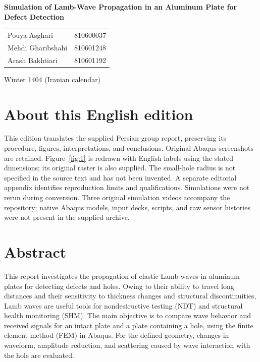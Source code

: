 \documentclass[11pt,a4paper]{article}
\begin{document}
\hypersetup{pageanchor=false}
\begin{titlepage}\centering\vspace*{25mm}
{\LARGE\bfseries Simulation of Lamb-Wave Propagation in an Aluminum Plate for Defect Detection\par}
\vspace{18mm}{\large Instructor: Dr. Ganjiani\par}\vspace{12mm}{\large Group 11\par}\vspace{6mm}
\begin{tabular}{ll}Pouya Asghari&810600037\\Mehdi Gharibshahi&810601248\\Arash Bakhtiari&810601192\end{tabular}
\vfill{\large Winter 1404 (Iranian calendar)\par}
\end{titlepage}\hypersetup{pageanchor=true}
\section*{About this English edition}
This edition translates the supplied Persian group report, preserving its procedure, figures, interpretations, and conclusions. Original Abaqus screenshots are retained. Figure~\ref{fig:1} is redrawn with English labels using the stated dimensions; its original raster is also supplied. The small-hole radius is not specified in the source text and has not been invented. A separate editorial appendix identifies reproduction limits and qualifications. Simulations were not rerun during conversion. Three original simulation videos accompany the repository; native Abaqus models, input decks, scripts, and raw sensor histories were not present in the supplied archive.
\section*{Abstract}
This report investigates the propagation of elastic Lamb waves in aluminum plates for detecting defects and holes. Owing to their ability to travel long distances and their sensitivity to thickness changes and structural discontinuities, Lamb waves are useful tools for nondestructive testing (NDT) and structural health monitoring (SHM). The main objective is to compare wave behavior and received signals for an intact plate and a plate containing a hole, using the finite element method (FEM) in Abaqus. For the defined geometry, changes in waveform, amplitude reduction, and scattering caused by wave interaction with the hole are evaluated.
\clearpage\tableofcontents\newpage\listoffigures\newpage
\end{document}
